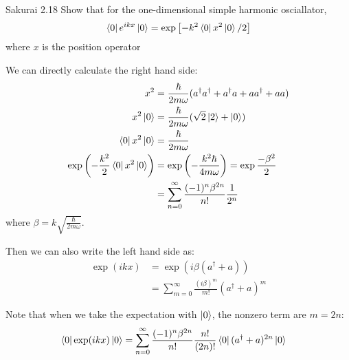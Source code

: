 \documentclass{article}
\begin{document}
\newpage
\begin{section}{Sakurai 2.18}
Show that for the one-dimensional simple harmonic osciallator,
$$
	\bra{0}e^{ikx}\ket{0} = \exp \left[ -k^2 \bra{0}x^2\ket{0}/2 \right]
$$
where $x$ is the position operator

\begin{tcolorbox}[breakable]
	We can directly calculate the right hand side:
	\begin{align*}
		x^2
		 & = \frac{\hbar}{2m\omega} (a^\dagger a^\dagger + a^\dagger a + a a^\dagger + a a) \\
		x^2 \ket{0}
		 & = \frac{\hbar}{2m\omega} (\sqrt{2} \ket{2} + \ket{0})                            \\
		\bra{0} x^2 \ket{0}
		 & = \frac{\hbar}{2m\omega}                                                         \\
		\exp \left( -\frac{k^2}{2} \bra{0} x^2 \ket{0} \right)
		 & = \exp \left( -\frac{k^2\hbar}{4m\omega} \right) = \exp \frac{-\beta^2}{2}       \\
		 & = \sum_{n=0}^\infty \frac{(-1)^n \beta^{2n}}{n!} \frac{1}{2^n}
	\end{align*}
	where $\beta = k \sqrt{\frac{\hbar}{2m\omega}}$.

	Then we can also write the left hand side as:
	\begin{align*}
		\exp (i k x) & = \exp (i\beta (a^\dagger + a))                             \\
		             & = \sum_{m=0}^\infty \frac{(i\beta)^m}{m!} (a^\dagger + a)^m
	\end{align*}

	Note that when we take the expectation with $\ket{0}$, the nonzero term are $m=2n$:
	\begin{align*}
		\bra{0} \exp (i k x) \ket{0} & = \sum_{n=0}^\infty \frac{(-1)^n \beta^{2n}}{n!} \frac{n!}{(2n)!} \bra{0} (a^\dagger + a)^{2n} \ket{0} 
	\end{align*}


\end{tcolorbox}
\end{section}
\end{document}
